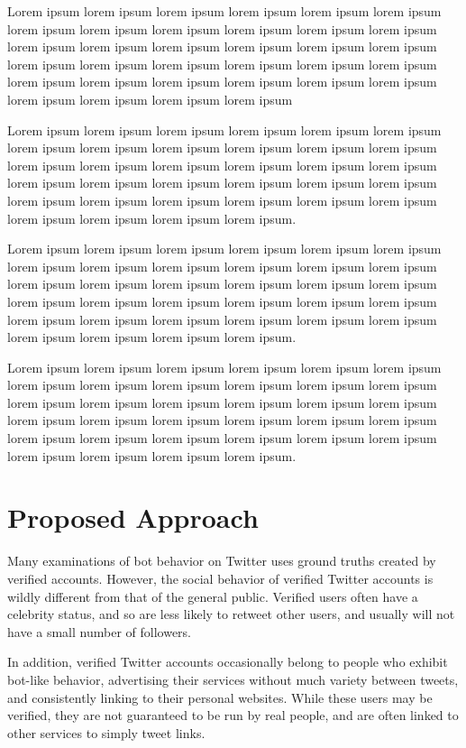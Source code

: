\documentclass{sig-alternate-05-2015}
\begin{document}
Lorem ipsum lorem ipsum lorem ipsum lorem ipsum lorem ipsum lorem ipsum lorem ipsum lorem ipsum lorem ipsum lorem ipsum lorem ipsum lorem ipsum lorem ipsum lorem ipsum lorem ipsum lorem ipsum lorem ipsum lorem ipsum lorem ipsum lorem ipsum lorem ipsum lorem ipsum lorem ipsum lorem ipsum lorem ipsum lorem ipsum lorem ipsum lorem ipsum lorem ipsum lorem ipsum lorem ipsum lorem ipsum lorem ipsum lorem ipsum

Lorem ipsum lorem ipsum lorem ipsum lorem ipsum lorem ipsum lorem ipsum lorem ipsum lorem ipsum lorem ipsum lorem ipsum lorem ipsum lorem ipsum lorem ipsum lorem ipsum lorem ipsum lorem ipsum lorem ipsum lorem ipsum lorem ipsum lorem ipsum lorem ipsum lorem ipsum lorem ipsum lorem ipsum lorem ipsum lorem ipsum lorem ipsum lorem ipsum lorem ipsum lorem ipsum lorem ipsum lorem ipsum lorem ipsum lorem ipsum.

Lorem ipsum lorem ipsum lorem ipsum lorem ipsum lorem ipsum lorem ipsum lorem ipsum lorem ipsum lorem ipsum lorem ipsum lorem ipsum lorem ipsum lorem ipsum lorem ipsum lorem ipsum lorem ipsum lorem ipsum lorem ipsum lorem ipsum lorem ipsum lorem ipsum lorem ipsum lorem ipsum lorem ipsum lorem ipsum lorem ipsum lorem ipsum lorem ipsum lorem ipsum lorem ipsum lorem ipsum lorem ipsum lorem ipsum lorem ipsum.

Lorem ipsum lorem ipsum lorem ipsum lorem ipsum lorem ipsum lorem ipsum lorem ipsum lorem ipsum lorem ipsum lorem ipsum lorem ipsum lorem ipsum lorem ipsum lorem ipsum lorem ipsum lorem ipsum lorem ipsum lorem ipsum lorem ipsum lorem ipsum lorem ipsum lorem ipsum lorem ipsum lorem ipsum lorem ipsum lorem ipsum lorem ipsum lorem ipsum lorem ipsum lorem ipsum lorem ipsum lorem ipsum lorem ipsum lorem ipsum.

\section{Proposed Approach}
Many examinations of bot behavior on Twitter uses ground truths created by verified accounts. However, the social behavior of verified Twitter accounts is wildly different from that of the general public. Verified users often have a celebrity status, and so are less likely to retweet other users, and usually will not have a small number of followers.

In addition, verified Twitter accounts occasionally belong to people who exhibit bot-like behavior, advertising their services without much variety between tweets, and consistently linking to their personal websites. While these users may be verified, they are not guaranteed to be run by real people, and are often linked to other services to simply tweet links.
\end{document}
